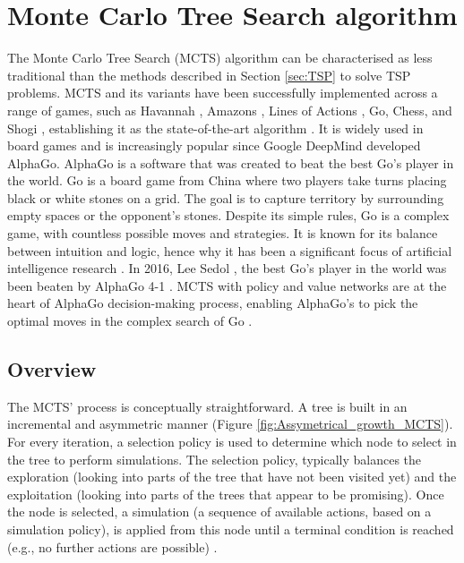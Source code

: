 \documentclass[conference]{IEEEtran}
\begin{document}
\section{Monte Carlo Tree Search algorithm}

The Monte Carlo Tree Search (MCTS) algorithm can be characterised as less traditional than the methods described in Section \ref{sec:TSP} to solve TSP problems. MCTS and its variants have been successfully implemented across a range of games, such as Havannah \cite{wiki:board_game}, Amazons \cite{wiki:Game_of_the_Amazons}, Lines of Actions \cite{wiki:Lines_of_Action}, Go, Chess, and Shogi \cite{wiki:Shogi}, establishing it as the state-of-the-art algorithm \cite{havannah,amazons,lines_of_actions}. It is widely used in board games and is increasingly popular since Google DeepMind developed AlphaGo. AlphaGo is a software that was created to beat the best Go's player in the world. Go is a board game from China where two players take turns placing black or white stones on a grid. The goal is to capture territory by surrounding empty spaces or the opponent's stones. Despite its simple rules, Go is a complex game, with countless possible moves and strategies. It is known for its balance between intuition and logic, hence why it has been a significant focus of artificial intelligence research \cite{wiki:Go}. In 2016, Lee Sedol \cite{wiki:Lee_Sedol}, the best Go's player in the world was been beaten by AlphaGo 4-1 \cite{alpha_go_documentary}. MCTS with policy and value networks are at the heart of AlphaGo decision-making process, enabling AlphaGo's to pick the optimal moves in the complex search of Go \cite{mcts_alpha_go_algorithm}.

\subsection{Overview}

The MCTS' process is conceptually straightforward. A tree is built in an incremental and asymmetric manner (Figure \ref{fig:Assymetrical_growth_MCTS}).
For every iteration, a selection policy is used to determine which node to select in the tree to perform simulations. 
The selection policy, typically balances the exploration  (looking into parts of the tree that have not been visited yet) and the exploitation (looking into parts of the trees that appear to be promising). 
Once the node is selected, a simulation (a sequence of available actions, based on a simulation policy), is applied from this node until a terminal condition is reached (e.g., no further actions are possible) \cite{mcts_various_policies}.
\end{document}
